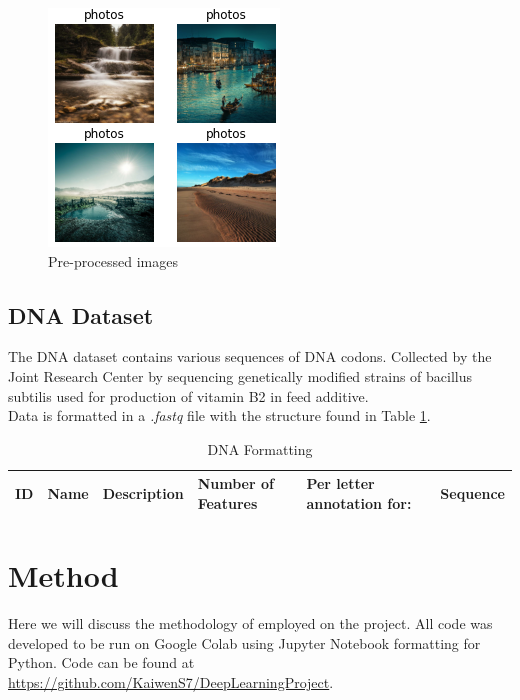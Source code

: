 \documentclass{article}
\begin{document}
	\begin{figure}[h]
		\centering
		\includegraphics[scale=1]{images/landscapes}
		\caption{Pre-processed images}
		\label{fig:landscapes}
	\end{figure}

	
	\subsection{DNA Dataset}
	The DNA dataset contains various sequences of DNA codons. Collected by the Joint Research Center by sequencing genetically modified strains of bacillus subtilis used for production of vitamin B2 in feed additive. \\
	Data is formatted in a {\em .fastq} file with the structure found in Table \ref{tab:dna}.
	
	\begin{table}
		\caption{DNA Formatting}
		\centering
		\begin{tabular}{llllll}
			\toprule
			ID     & Name     & Description & Number of Features & Per letter annotation for: & Sequence \\
			\bottomrule
		\end{tabular}
		\label{tab:dna}
	\end{table}
	
	\section{Method}
	Here we will discuss the methodology of employed on the project. All code was developed to be run on Google Colab using Jupyter Notebook formatting for Python. Code can be found at \url{https://github.com/KaiwenS7/DeepLearningProject}.
\end{document}
